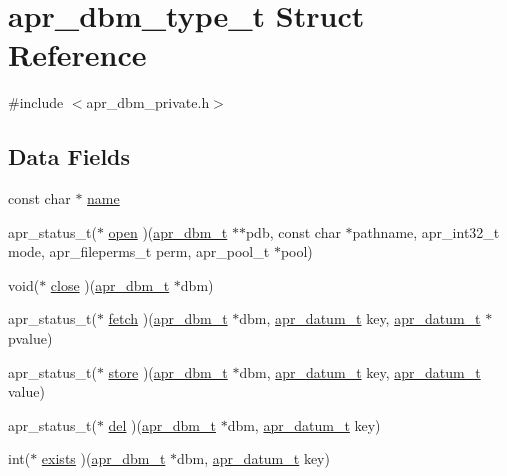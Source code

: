 \hypertarget{structapr__dbm__type__t}{\section{apr\-\_\-dbm\-\_\-type\-\_\-t Struct Reference}
\label{structapr__dbm__type__t}
}


{\ttfamily \#include $<$apr\-\_\-dbm\-\_\-private.\-h$>$}

\subsection*{Data Fields}
\begin{DoxyCompactItemize}
\item 
const char $\ast$ \hyperlink{structapr__dbm__type__t_af023b97eba22415785caf005fc5dcf64}{name}
\item 
apr\-\_\-status\-\_\-t($\ast$ \hyperlink{structapr__dbm__type__t_a4695443269822d7ca9208bd6579d3635}{open} )(\hyperlink{structapr__dbm__t}{apr\-\_\-dbm\-\_\-t} $\ast$$\ast$pdb, const char $\ast$pathname, apr\-\_\-int32\-\_\-t mode, apr\-\_\-fileperms\-\_\-t perm, apr\-\_\-pool\-\_\-t $\ast$pool)
\item 
void($\ast$ \hyperlink{structapr__dbm__type__t_a21e4c81ee578b14ef5503c5ac7ee9312}{close} )(\hyperlink{structapr__dbm__t}{apr\-\_\-dbm\-\_\-t} $\ast$dbm)
\item 
apr\-\_\-status\-\_\-t($\ast$ \hyperlink{structapr__dbm__type__t_a17d44119b2ba7594a9a6593b82bc8d5f}{fetch} )(\hyperlink{structapr__dbm__t}{apr\-\_\-dbm\-\_\-t} $\ast$dbm, \hyperlink{structapr__datum__t}{apr\-\_\-datum\-\_\-t} key, \hyperlink{structapr__datum__t}{apr\-\_\-datum\-\_\-t} $\ast$pvalue)
\item 
apr\-\_\-status\-\_\-t($\ast$ \hyperlink{structapr__dbm__type__t_ae156d00ff445fbe6472565165f7e746c}{store} )(\hyperlink{structapr__dbm__t}{apr\-\_\-dbm\-\_\-t} $\ast$dbm, \hyperlink{structapr__datum__t}{apr\-\_\-datum\-\_\-t} key, \hyperlink{structapr__datum__t}{apr\-\_\-datum\-\_\-t} value)
\item 
apr\-\_\-status\-\_\-t($\ast$ \hyperlink{structapr__dbm__type__t_a06d2f0a91b5ea931996acf364f392073}{del} )(\hyperlink{structapr__dbm__t}{apr\-\_\-dbm\-\_\-t} $\ast$dbm, \hyperlink{structapr__datum__t}{apr\-\_\-datum\-\_\-t} key)
\item 
int($\ast$ \hyperlink{structapr__dbm__type__t_ae671f4abb2d4f2ff42b6368f057c2166}{exists} )(\hyperlink{structapr__dbm__t}{apr\-\_\-dbm\-\_\-t} $\ast$dbm, \hyperlink{structapr__datum__t}{apr\-\_\-datum\-\_\-t} key)
$$
\end{DoxyCompactItemize}
